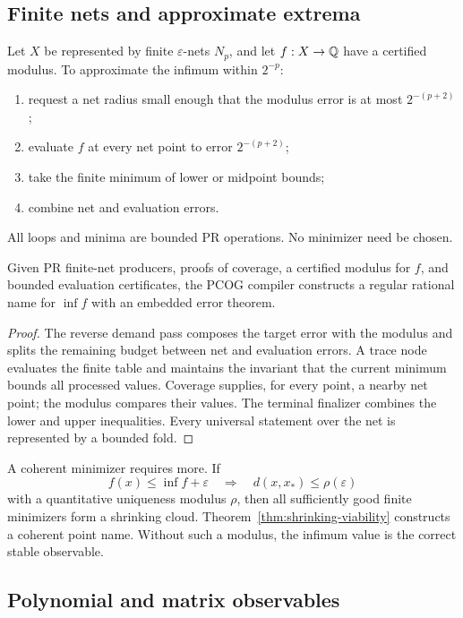 \subsection{Finite nets and approximate extrema}

Let \(X\) be represented by finite \(\varepsilon\)-nets \(N_p\), and let
\(f:X\to\mathbb{Q}\) have a certified modulus.  To approximate the infimum within
\(2^{-p}\):
\begin{enumerate}
\item request a net radius small enough that the modulus error is at most
\(2^{-(p+2)}\);
\item evaluate \(f\) at every net point to error \(2^{-(p+2)}\);
\item take the finite minimum of lower or midpoint bounds;
\item combine net and evaluation errors.
\end{enumerate}
All loops and minima are bounded PR operations.  No minimizer need be chosen.

\begin{theorem}
\label{thm:finite-net-infimum}
Given PR finite-net producers, proofs of coverage, a certified modulus for
\(f\), and bounded evaluation certificates, the PCOG compiler constructs a
regular rational name for \(\inf f\) with an embedded error theorem.
\end{theorem}

\begin{proof}
The reverse demand pass composes the target error with the modulus and
splits the remaining budget between net and evaluation errors.  A trace node
evaluates the finite table and maintains the invariant that the current
minimum bounds all processed values.  Coverage supplies, for every point, a
nearby net point; the modulus compares their values.  The terminal finalizer
combines the lower and upper inequalities.  Every universal statement over the
net is represented by a bounded fold.
\end{proof}

A coherent minimizer requires more.  If
\[
 f(x)\leq\inf f+\varepsilon\quad\Longrightarrow\quad
 d(x,x_*)\leq\rho(\varepsilon)
\]
with a quantitative uniqueness modulus \(\rho\), then all sufficiently good
finite minimizers form a shrinking cloud.  Theorem~\ref{thm:shrinking-viability}
constructs a coherent point name.  Without such a modulus, the infimum value is
the correct stable observable.

\subsection{Polynomial and matrix observables}

